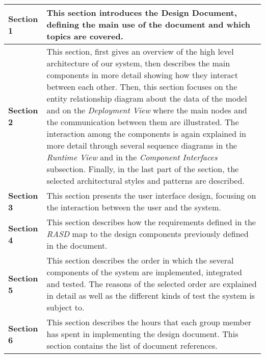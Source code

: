 \begin{center}
\centering
\begin{table}[H]
\centering
\begin{tabular} { l p{10 cm} }
\toprule
\textbf{Section 1} & This section introduces the Design Document, defining the main use of the document and which topics are covered.                                                                                                                                  \\ \midrule
\textbf{Section 2} & This section, first gives an overview of the high level architecture of our system, then describes the main components in more detail showing how they interact between each other. Then, this section focuses on the entity relationship diagram about the data of the model and on the \textit{Deployment View} where the main nodes and the communication between them are illustrated. The interaction among the components is again explained in more detail through several sequence diagrams in the \textit{Runtime View} and in the \textit{Component Interfaces} subsection. Finally, in the last part of the section, the selected architectural styles and patterns are described. \\ \midrule
\textbf{Section 3} &  This section presents the user interface design, focusing on the interaction between the user and the system.  \\ \midrule
\textbf{Section 4}  & This section describes how the requirements defined in the \textit{RASD} map to the design components previously defined in the document.\\ \midrule
\textbf{Section 5} &  This section describes the order in which the several components of the system are implemented, integrated and tested. The reasons of the selected order are explained in detail as well as the different kinds of test the system is subject to.
\\ \midrule
\textbf {Section 6} & This section describes the hours that each group member has spent in implementing the design document.
This section contains the list of document references. \\ \bottomrule
\end{tabular}
\end{table}
\clearpage
\end{center}
\clearpage